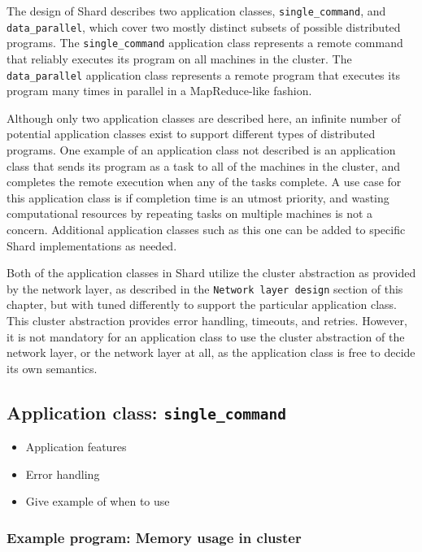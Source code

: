 \documentclass[twoside]{report}
\newcommand{\todoi}[1]{\todo[inline, color=blue!20]{TODO: {#1}}}
\begin{document}
The design of Shard describes two application classes, \texttt{single\_command}, and \texttt{data\_parallel}, which cover two mostly distinct subsets of possible distributed programs.
The \texttt{single\_command} application class represents a remote command that reliably executes its program on all machines in the cluster.
The \texttt{data\_parallel} application class represents a remote program that executes its program many times in parallel in a MapReduce-like fashion.

Although only two application classes are described here, an infinite number of potential application classes exist to support different types of distributed programs.
One example of an application class not described is an application class that sends its program as a task to all of the machines in the cluster, and completes the remote execution when any of the tasks complete.
A use case for this application class is if completion time is an utmost priority, and wasting computational resources by repeating tasks on multiple machines is not a concern.
Additional application classes such as this one can be added to specific Shard implementations as needed.

Both of the application classes in Shard utilize the cluster abstraction as provided by the network layer, as described in the \texttt{Network layer design} section of this chapter, but with tuned differently to support the particular application class.
This cluster abstraction provides error handling, timeouts, and retries.
However, it is not mandatory for an application class to use the cluster abstraction of the network layer, or the network layer at all, as the application class is free to decide its own semantics.

\subsection{Application class: \texttt{single\_command}}

\todoi{Write this subsection}

\begin{itemize}
  \item Application features
  \item Error handling
  \item Give example of when to use
\end{itemize}

\subsubsection{Example program: Memory usage in cluster}
\end{document}
